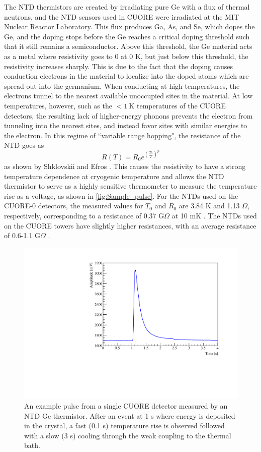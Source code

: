 The NTD thermistors are created by irradiating pure Ge with a flux of thermal neutrons, and the NTD sensors used in CUORE were irradiated at the MIT Nuclear Reactor Laboratory.
This flux produces Ga, As, and Se, which dopes the Ge, and the doping stops before the Ge reaches a critical doping threshold such that it still remains a semiconductor.
Above this threshold, the Ge material acts as a metal where resistivity goes to 0 at 0 K, but just below this threshold, the resistivity increases sharply.
This is due to the fact that the doping causes conduction electrons in the material to localize into the doped atoms which are spread out into the germanium.
When conducting at high temperatures, the electrons tunnel to the nearest available unoccupied sites in the material.
At low temperatures, however, such as the $<1~\textrm{K}$ temperatures of the CUORE detectors, the resulting lack of higher-energy phonons prevents the electron from tunneling into the nearest sites, and instead favor sites with similar energies to the electron.
In this regime of ``variable range hopping", the resistance of the NTD goes as
\begin{equation}
    R(T) = R_0 e^{\left(\frac{T_0}{T}\right)^p} 
    \label{eq:NTD_Resistivity}
\end{equation}
as shown by Shklovskii and Efros \cite{NTDResistivity}.
This causes the resistivity to have a strong temperature dependence at cryogenic temperature and allows the NTD thermistor to serve as a highly sensitive thermometer to measure the temperature rise as a voltage, as shown in \autoref{fig:Sample_pulse}.
For the NTDs used on the CUORE-0 detectors, the measured values for $T_0$ and $R_0$ are 3.84 K and 1.13 $\Omega$, respectively, corresponding to a resistance of 0.37 G$\Omega$ at 10 mK \cite{Alduino:2016vjd}.
The NTDs used on the CUORE towers have slightly higher resistances, with an average resistance of 0.6-1.1 G$\Omega$ \cite{Nutini:LoadCurves}.

\begin{figure}[htbp]
\centering
\includegraphics[width=0.7\linewidth]{Figures/pulse-conference.pdf}
\caption[An example pulse from a single CUORE detector measured by an NTD Ge thermistor.]
{An example pulse from a single CUORE detector measured by an NTD Ge thermistor.
After an event at 1 s where energy is deposited in the crystal, a fast (0.1 s) temperature rise is observed followed with a slow (3 s) cooling through the weak coupling to the thermal bath.}
\label{fig:Sample_pulse}
\end{figure}

